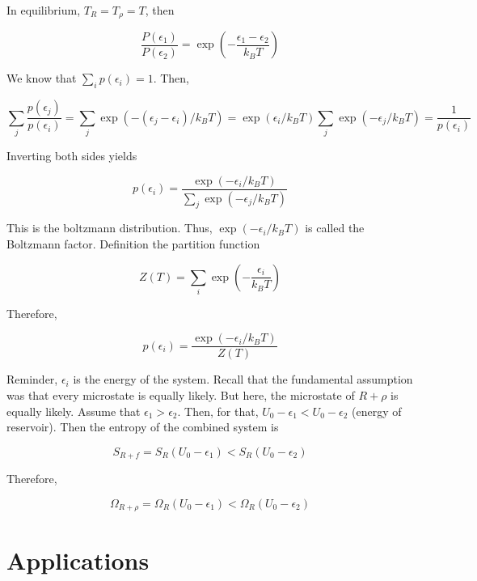 \documentclass{article}
\newtheorem{one minute paper}[theorem]{One Minute Paper}
\begin{document}
In equilibrium, $T_R = T_\rho = T$, then 

\begin{equation}
    \frac{P(\epsilon_1)}{P(\epsilon_2)} = \exp\left( -\frac{\epsilon_1 - \epsilon_2}{k_B T} \right)
\end{equation}

We know that $\sum_i p(\epsilon_i) = 1$. Then, 

\begin{equation}
    \sum_j \frac{p(\epsilon_j)}{p(\epsilon_i)} = \sum_j \exp(-(\epsilon_j - \epsilon_i)/k_B T) = \exp(\epsilon_i/k_BT) \sum_j \exp(-\epsilon_j /k_B T)= \frac{1}{p(\epsilon_i)}
\end{equation}

Inverting both sides yields 

\begin{equation}
    p(\epsilon_i) = \frac{\exp(-\epsilon_i/k_B T)}{\sum_j \exp(-\epsilon_j/k_B T)}
\end{equation}

This is the boltzmann distribution. Thus, $\exp(-\epsilon_i/k_B T)$ is called the Boltzmann factor. Definition the partition function 

\begin{equation}
    Z(T) = \sum_i \exp(-\frac{\epsilon_i}{k_B T})
\end{equation}

Therefore, 

\begin{equation}
    p(\epsilon_i) = \frac{\exp(-\epsilon_i/k_B T)}{Z(T)}
\end{equation}

Reminder, $\epsilon_i$ is the energy of the system. Recall that the fundamental assumption was that every microstate is equally likely. But here, the microstate of $R + \rho$ is equally likely. Assume that $\epsilon_1 > \epsilon_2$. Then, for that, $U_0 - \epsilon_1 < U_0 - \epsilon_2$ (energy of reservoir). Then the entropy of the combined system is 

\begin{equation}
    S_{R + f} = S_R(U_0 - \epsilon_1) < S_R(U_0 - \epsilon_2)
\end{equation}

Therefore, 

\begin{equation}
    \Omega_{R + \rho} = \Omega_R(U_0 - \epsilon_1) < \Omega_R(U_0 - \epsilon_2)
\end{equation}

\section*{Applications}
\end{document}
